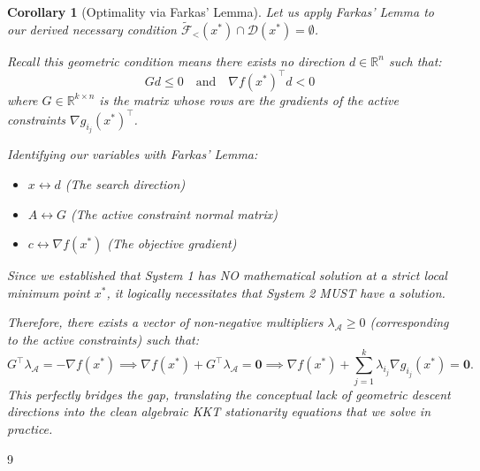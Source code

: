 \documentclass[11pt]{article}
\theoremstyle{definition}
\theoremstyle{plain}
\newtheorem{corollary}{Corollary}
\theoremstyle{remark}
\begin{document}
\begin{corollary}[Optimality via Farkas' Lemma]
  \label{thm:farkas_opt}
  Let us apply Farkas' Lemma to our derived necessary condition $\widetilde{\mathcal{F}}_{<}(x^*) \cap \mathcal{D}(x^*) = \emptyset$.
  
  Recall this geometric condition means there exists no direction $d \in \mathbb{R}^n$ such that:
  \[
    Gd \leq 0 \quad \text{and} \quad \nabla f(x^*)^\top d < 0
  \]
  where $G \in \mathbb{R}^{k \times n}$ is the matrix whose rows are the gradients of the active constraints $\nabla g_{i_j}(x^*)^\top$.
  
  Identifying our variables with Farkas' Lemma:
  \begin{itemize}
    \item $x \longleftrightarrow d$ (The search direction)
    \item $A \longleftrightarrow G$ (The active constraint normal matrix)
    \item $c \longleftrightarrow \nabla f(x^*)$ (The objective gradient)
  \end{itemize}
  Since we established that System 1 has \emph{NO mathematical solution} at a strict local minimum point $x^*$, it logically necessitates that System 2 \emph{MUST have a solution}.
  
  Therefore, there exists a vector of non-negative multipliers $\lambda_{\mathcal{A}} \geq 0$ (corresponding to the active constraints) such that:
  \[
    G^\top \lambda_{\mathcal{A}} = -\nabla f(x^*) \implies \nabla f(x^*) + G^\top \lambda_{\mathcal{A}} = \mathbf{0} \implies \nabla f(x^*) + \sum_{j=1}^{k} \lambda_{i_j} \nabla g_{i_j}(x^*) = \mathbf{0}.
  \]
  This perfectly bridges the gap, translating the conceptual lack of geometric descent directions into the clean algebraic KKT stationarity equations that we solve in practice.
\end{corollary}

\bigskip

\begin{thebibliography}{9}
\end{thebibliography}
\end{document}
